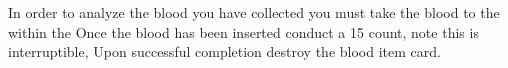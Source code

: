 \documentclass[green]{guildcamp4}
\begin{document}
\name{\gReadBlood{}}

In order to analyze the blood you have collected you must take the blood to the \sBloodAnalyzer{} within the \pBioLabC{} 
Once the blood has been inserted conduct a 15 count, note this is interruptible, 
Upon successful completion destroy the blood item card.
\end{document}
